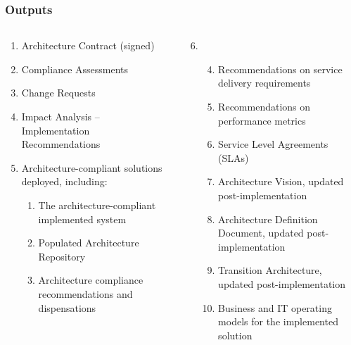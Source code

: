 \documentclass[aspectratio=169, table]{beamer}
\begin{document}
	\begin{frame}
		\frametitle{Outputs}
		\vspace{22pt}
		\begin{columns}[onlytextwidth]
			\begin{column}{0.5\textwidth}
				\begin{enumerate}
					\item Architecture Contract (signed)
					\item Compliance Assessments
					\item Change Requests
					\item Impact Analysis – Implementation Recommendations
					\item Architecture-compliant solutions deployed, including:
					\begin{enumerate}
						\item The architecture-compliant implemented system
						\item Populated Architecture Repository
						\item Architecture compliance recommendations and dispensations
					\end{enumerate}
				\end{enumerate}
				
			\end{column}
			\begin{column}{0.5\textwidth}
				\begin{enumerate}
					\setcounter{enumi}{5}
					\item[]
					\begin{enumerate}
						\setcounter{enumii}{3}
						\item Recommendations on service delivery requirements
						\item Recommendations on performance metrics
						\item Service Level Agreements (SLAs)
						\item Architecture Vision, updated post-implementation
						\item Architecture Definition Document, updated post-implementation
						\item Transition Architecture, updated post-implementation
						\item Business and IT operating models for the implemented solution
					\end{enumerate}
				\end{enumerate}
			\end{column}
		\end{columns}
	\end{frame}
	
\end{document}
